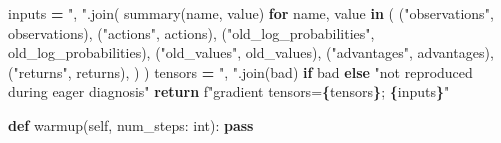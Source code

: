 \documentclass[
  chinese,
  11pt,
  letterpaper,
]{article}
\newenvironment{Shaded}{\begin{snugshade}}{\end{snugshade}}
\newcommand{\BuiltInTok}[1]{#1}
\newcommand{\ControlFlowTok}[1]{\textcolor[rgb]{0.13,0.29,0.53}{\textbf{#1}}}
\newcommand{\KeywordTok}[1]{\textcolor[rgb]{0.13,0.29,0.53}{\textbf{#1}}}
\newcommand{\NormalTok}[1]{#1}
\newcommand{\OperatorTok}[1]{\textcolor[rgb]{0.81,0.36,0.00}{\textbf{#1}}}
\newcommand{\SpecialCharTok}[1]{\textcolor[rgb]{0.81,0.36,0.00}{\textbf{#1}}}
\newcommand{\SpecialStringTok}[1]{\textcolor[rgb]{0.31,0.60,0.02}{#1}}
\newcommand{\StringTok}[1]{\textcolor[rgb]{0.31,0.60,0.02}{#1}}
\newcommand{\VariableTok}[1]{\textcolor[rgb]{0.00,0.00,0.00}{#1}}
\renewenvironment{Shaded}{\par\smallskip}{\par\smallskip}
\begin{document}
\begin{Shaded}
\begin{Highlighting}[]
\NormalTok{        inputs }\OperatorTok{=} \StringTok{", "}\NormalTok{.join(}
\NormalTok{            summary(name, value)}
            \ControlFlowTok{for}\NormalTok{ name, value }\KeywordTok{in}\NormalTok{ (}
\NormalTok{                (}\StringTok{"observations"}\NormalTok{, observations),}
\NormalTok{                (}\StringTok{"actions"}\NormalTok{, actions),}
\NormalTok{                (}\StringTok{"old\_log\_probabilities"}\NormalTok{, old\_log\_probabilities),}
\NormalTok{                (}\StringTok{"old\_values"}\NormalTok{, old\_values),}
\NormalTok{                (}\StringTok{"advantages"}\NormalTok{, advantages),}
\NormalTok{                (}\StringTok{"returns"}\NormalTok{, returns),}
\NormalTok{            )}
\NormalTok{        )}
\NormalTok{        tensors }\OperatorTok{=} \StringTok{", "}\NormalTok{.join(bad) }\ControlFlowTok{if}\NormalTok{ bad }\ControlFlowTok{else} \StringTok{"not reproduced during eager diagnosis"}
        \ControlFlowTok{return} \SpecialStringTok{f"gradient tensors=}\SpecialCharTok{\{}\NormalTok{tensors}\SpecialCharTok{\}}\SpecialStringTok{; }\SpecialCharTok{\{}\NormalTok{inputs}\SpecialCharTok{\}}\SpecialStringTok{"}

    \KeywordTok{def}\NormalTok{ warmup(}\VariableTok{self}\NormalTok{, num\_steps: }\BuiltInTok{int}\NormalTok{):}
        \ControlFlowTok{pass}


\end{Highlighting}
\end{Shaded}
\end{document}
